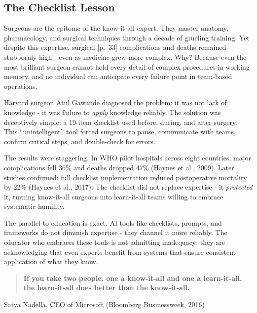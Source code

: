 \documentclass[
  letterpaper,
  DIV=11,
  numbers=noendperiod]{scrreprt}
\begin{document}
\subsection{The Checklist Lesson}\label{the-checklist-lesson}

Surgeons are the epitome of the know-it-all expert. They master anatomy,
pharmacology, and surgical techniques through a decade of grueling
training. Yet despite this expertise, surgical {[}p.~33{]} complications
and deaths remained stubbornly high - even as medicine grew more
complex. Why? Because even the most brilliant surgeon cannot hold every
detail of complex procedures in working memory, and no individual can
anticipate every failure point in team-based operations.

Harvard surgeon Atul Gawande diagnosed the problem: it was not lack of
knowledge - it was failure to \emph{apply} knowledge reliably. The
solution was deceptively simple: a 19-item checklist used before,
during, and after surgery. This ``unintelligent'' tool forced surgeons
to pause, communicate with teams, confirm critical steps, and
double-check for errors.

The results were staggering. In WHO pilot hospitals across eight
countries, major complications fell 36\% and deaths dropped 47\% (Haynes
et al., 2009). Later studies confirmed: full checklist implementation
reduced postoperative mortality by 22\% (Haynes et al., 2017). The
checklist did not replace expertise - it \emph{protected} it, turning
know-it-all surgeons into learn-it-all teams willing to embrace
systematic humility.

The parallel to education is exact. AI tools like checklists, prompts,
and frameworks do not diminish expertise - they channel it more
reliably. The educator who embraces these tools is not admitting
inadequacy; they are acknowledging that even experts benefit from
systems that ensure consistent application of what they know.

\begin{tcolorbox}[enhanced jigsaw, arc=.35mm, bottomrule=.15mm, bottomtitle=1mm, breakable, colback=white, colbacktitle=quarto-callout-tip-color!10!white, colframe=quarto-callout-tip-color-frame, coltitle=black, left=2mm, leftrule=.75mm, opacityback=0, opacitybacktitle=0.6, rightrule=.15mm, title=\textcolor{quarto-callout-tip-color}{\faLightbulb}\hspace{0.5em}{Quote}, titlerule=0mm, toprule=.15mm, toptitle=1mm]

\begin{quote}
\textbf{If you take two people, one a know-it-all and one a
learn-it-all, the learn-it-all does better than the know-it-all.}
\end{quote}

Satya Nadella, CEO of Microsoft (Bloomberg Businessweek, 2016)

\end{tcolorbox}
\end{document}
